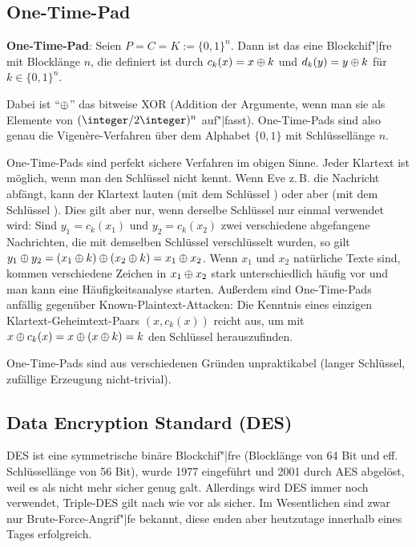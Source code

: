 \pagebreak

\subsection{%
    One-Time-Pad%
}

\textbf{One-Time-Pad}:
Seien $P = C = K := \{0, 1\}^n$.
Dann ist das  eine Blockchif"|fre mit Blocklänge $n$,
die definiert ist durch $c_k(x) = x \oplus k$ und $d_k(y) = y \oplus k$ für $k \in \{0, 1\}^n$.

Dabei ist "`$\oplus$"' das bitweise XOR
(Addition der Argumente, wenn man sie als Elemente von $(\integer/2\integer)^n$ auf"|fasst).
One-Time-Pads sind also genau die Vigenère-Verfahren über dem Alphabet $\{0, 1\}$
mit Schlüssellänge $n$.

One-Time-Pads sind perfekt sichere Verfahren im obigen Sinne.
Jeder Klartext ist möglich, wenn man den Schlüssel nicht kennt.
Wenn Eve z.\,B. die Nachricht  abfängt, kann der Klartext  lauten
(mit dem Schlüssel ) oder aber  (mit dem Schlüssel ).
Dies gilt aber nur, wenn derselbe Schlüssel nur einmal verwendet wird:
Sind $y_1 = c_k(x_1)$ und $y_2 = c_k(x_2)$ zwei verschiedene abgefangene Nachrichten,
die mit demselben Schlüssel verschlüsselt wurden, so gilt
$y_1 \oplus y_2 = (x_1 \oplus k) \oplus (x_2 \oplus k) = x_1 \oplus x_2$.
Wenn $x_1$ und $x_2$ natürliche Texte sind, kommen verschiedene Zeichen in
$x_1 \oplus x_2$ stark unterschiedlich häufig vor und man kann eine Häufigkeitsanalyse starten.
Außerdem sind One-Time-Pads anfällig gegenüber Known-Plaintext-Attacken:
Die Kenntnis eines einzigen Klartext-Geheimtext-Paars $(x, c_k(x))$ reicht aus, um mit
$x \oplus c_k(x) = x \oplus (x \oplus k) = k$ den Schlüssel herauszufinden.

One-Time-Pads sind aus verschiedenen Gründen unpraktikabel
(langer Schlüssel, zufällige Erzeugung nicht-trivial).

\subsection{%
    Data Encryption Standard (DES)%
}

DES ist eine symmetrische binäre Blockchif"|fre
(Blocklänge von 64 Bit und eff. Schlüssellänge von 56 Bit), wurde 1977 eingeführt und 2001 durch
AES abgelöst, weil es als nicht mehr sicher genug galt.
Allerdings wird DES immer noch verwendet, Triple-DES gilt nach wie vor als sicher.
Im Wesentlichen sind zwar nur Brute-Force-Angrif"|fe bekannt,
diese enden aber heutzutage innerhalb eines Tages erfolgreich.

